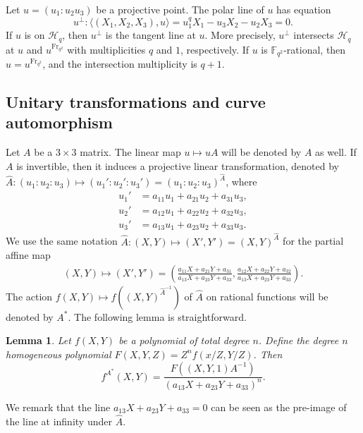 \documentclass[a4paper]{amsart}
\theoremstyle{plain}
\newtheorem{lemma}[theorem]{Lemma}
\theoremstyle{definition}
\theoremstyle{remark}
\newcommand{\Frob}{{\mathrm{Fr}_{q^2}}}
\begin{document}
Let $u=(u_1:u_2u_3)$ be a projective point. The polar line of $u$ has equation
\[u^\perp: \langle (X_1,X_2,X_3), u \rangle = u_1^qX_1-u_3X_2-u_2X_3=0.\]
If $u$ is on $\mathscr{H}_q$, then $u^\perp$ is the tangent line at $u$. More precisely, $u^\perp$ intersects $\mathscr{H}_q$ at $u$ and $u^\Frob$ with multiplicities $q$ and $1$, respectively. If $u$ is $\mathbb{F}_{q^2}$-rational, then $u=u^\Frob$, and the intersection multiplicity is $q+1$. 

\subsection{Unitary transformations and curve automorphism} \label{ssec:unitary}

Let $A$ be a $3\times 3$ matrix. The linear map $u\mapsto uA$ will be denoted by $A$ as well. If $A$ is invertible, then it induces a projective linear transformation, denoted by $\hat{A}:(u_1:u_2:u_3)\mapsto (u_1':u_2':u_3')=(u_1:u_2:u_3)^{\hat{A}}$, where
\begin{align*} %
u_1' &= a_{11}u_1+a_{21}u_2+a_{31}u_3, \\
u_2' &= a_{12}u_1+a_{22}u_2+a_{32}u_3, \\
u_3' &= a_{13}u_1+a_{23}u_2+a_{33}u_3. 
\end{align*}
We use the same notation $\hat{A}:(X,Y) \mapsto (X',Y')=(X,Y)^{\hat{A}}$ for the partial affine map
\begin{align*} %
(X,Y) \mapsto (X',Y') = \left(\frac{a_{11}X+a_{21}Y+a_{31}}{a_{13}X+a_{23}Y+a_{33}}, \frac{a_{12}X+a_{22}Y+a_{32}}{a_{13}X+a_{23}Y+a_{33}}\right).
\end{align*}
The action $f(X,Y) \mapsto f((X,Y)^{\hat{A}^{-1}})$ of $\hat{A}$ on rational functions will be denoted by $A^*$. The following lemma is straightforward.
\begin{lemma} \label{lm:f-action}
Let $f(X,Y)$ be a polynomial of total degree $n$. Define the degree $n$ homogeneous polynomial $F(X,Y,Z)=Z^n f(x/Z,Y/Z)$. Then
\[f^{A^*}(X,Y)=\frac{F((X,Y,1)A^{-1})}{(a_{13}X+a_{23}Y+a_{33})^n}.\]
\end{lemma}
We remark that the line $a_{13}X+a_{23}Y+a_{33}=0$ can be seen as the pre-image of the line at infinity under $\hat{A}$. 
\end{document}
